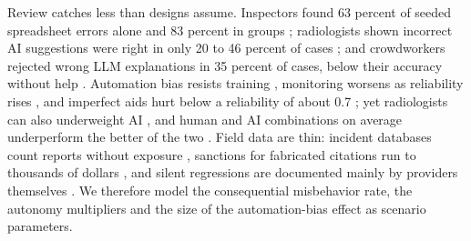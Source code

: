 Review catches less than designs assume. Inspectors found 63 percent of seeded spreadsheet errors alone and 83 percent in groups \citep{panko1999applying}; radiologists shown incorrect AI suggestions were right in only 20 to 46 percent of cases \citep{dratsch2023automation}; and crowdworkers rejected wrong LLM explanations in 35 percent of cases, below their accuracy without help \citep{si2024large}. Automation bias resists training \citep{parasuraman2010complacency,goddard2012automation}, monitoring worsens as reliability rises \citep{bailey2007automation}, and imperfect aids hurt below a reliability of about 0.7 \citep{wickens2007benefits}; yet radiologists can also underweight AI \citep{agarwal2023combining}, and human and AI combinations on average underperform the better of the two \citep{vaccaro2024when}. Field data are thin: incident databases count reports without exposure \citep{mcgregor2021preventing,atherton2026ai}, sanctions for fabricated citations run to thousands of dollars \citep{mata2023avianca,ochsner2025ai}, and silent regressions are documented mainly by providers themselves \citep{chen2024chatgpt,openai2025expanding,anthropic2026update}. We therefore model the consequential misbehavior rate, the autonomy multipliers and the size of the automation-bias effect as scenario parameters.
